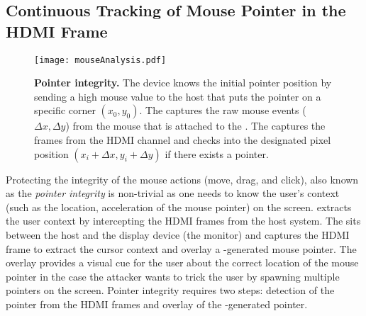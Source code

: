 \subsection{Continuous Tracking of Mouse Pointer in the HDMI Frame}
\label{sec:systemDesign:analysis}


\begin{figure}[t]
\centering
\texttt{[image: mouseAnalysis.pdf]}
\caption{\textbf{Pointer integrity.} The device knows the initial pointer position by sending a high mouse value to the host that puts the pointer on a specific corner $(x_0, y_0)$. \one The \device captures the raw mouse events ($\Delta x, \Delta y$) from the mouse that is attached to the \device. \two The \device captures the frames from the HDMI channel and checks into the designated pixel position $(x_i + \Delta x, y_i + \Delta y)$ if there exists a pointer.}
\label{fig:mouseAnalysis}
\centering
\end{figure}


Protecting the integrity of the mouse actions (move, drag, and click), also known as the \emph{pointer integrity} is non-trivial as one needs to know the user's context (such as the location, acceleration of the mouse pointer) on the screen. \name extracts the user context by intercepting the HDMI frames from the host system. The \device sits between the host and the display device (the monitor) and captures the HDMI frame to extract the cursor context and overlay a \device-generated mouse pointer. The overlay provides a visual cue for the user about the correct location of the mouse pointer in the case the attacker wants to trick the user by spawning multiple pointers on the screen. Pointer integrity requires two steps: detection of the pointer from the HDMI frames and overlay of the \device-generated pointer.

